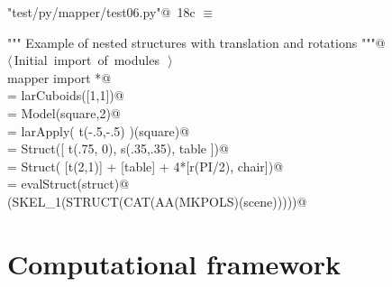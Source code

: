 \documentclass[11pt,oneside]{article}	%
\begin{document}
\begin{flushleft} \small \label{scrap35}
\protect{}\verb@"test/py/mapper/test06.py"@\nobreak\ {\footnotesize 18c }$\equiv$
\vspace{-1ex}
\begin{list}{}{} \item
\mbox{}\verb@""" Example of nested structures with translation and rotations """@\\
\mbox{}\verb@@\hbox{$\langle\,$Initial import of modules\nobreak\ {\footnotesize {}}$\,\rangle$}\verb@@\\
\mbox{}\verb@from mapper import *@\\
\mbox{}\verb@square = larCuboids([1,1])@\\
\mbox{}\verb@square = Model(square,2)@\\
\mbox{}\verb@table = larApply( t(-.5,-.5) )(square)@\\
\mbox{}\verb@chair = Struct([ t(.75, 0), s(.35,.35), table ])@\\
\mbox{}\verb@struct = Struct( [t(2,1)] + [table] + 4*[r(PI/2), chair])@\\
\mbox{}\verb@scene = evalStruct(struct)@\\
\mbox{}\verb@VIEW(SKEL_1(STRUCT(CAT(AA(MKPOLS)(scene)))))@\\
\mbox{}\verb@@{\NWsep}
\end{list}
\vspace{-2ex}
\end{flushleft}

\section{Computational framework}
\end{document}
